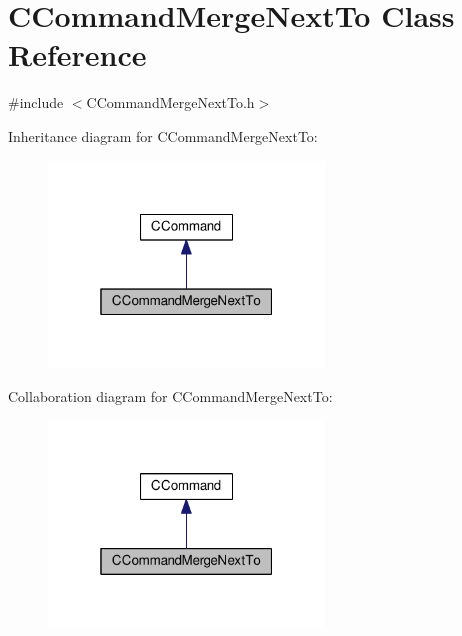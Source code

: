 \hypertarget{classCCommandMergeNextTo}{}\section{C\+Command\+Merge\+Next\+To Class Reference}
\label{classCCommandMergeNextTo}


{\ttfamily \#include $<$C\+Command\+Merge\+Next\+To.\+h$>$}



Inheritance diagram for C\+Command\+Merge\+Next\+To\+:\nopagebreak
\begin{figure}[H]
\begin{center}
\leavevmode
\includegraphics[width=208pt]{classCCommandMergeNextTo__inherit__graph}
\end{center}
\end{figure}


Collaboration diagram for C\+Command\+Merge\+Next\+To\+:\nopagebreak
\begin{figure}[H]
\begin{center}
\leavevmode
\includegraphics[width=208pt]{classCCommandMergeNextTo__coll__graph}
\end{center}
\end{figure}
